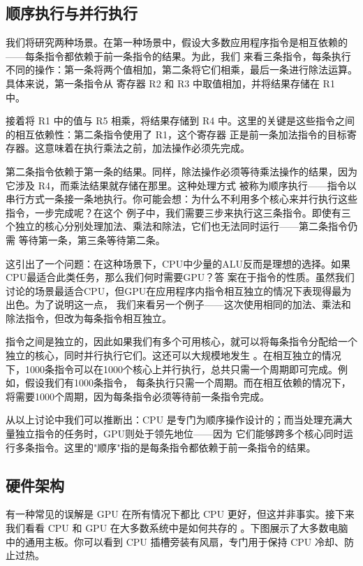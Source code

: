 \subsection{顺序执行与并行执行}

我们将研究两种场景。在第一种场景中，假设大多数应用程序指令是相互依赖的——每条指令都依赖于前一条指令的结果。为此，我们
来看三条指令，每条执行不同的操作：第一条将两个值相加，第二条将它们相乘，最后一条进行除法运算。具体来说，第一条指令从
寄存器 R2 和 R3 中取值相加，并将结果存储在 R1 中。

接着将 R1 中的值与 R5 相乘，将结果存储到 R4 中。这里的关键是这些指令之间的相互依赖性：第二条指令使用了 R1，这个寄存器
正是前一条加法指令的目标寄存器。这意味着在执行乘法之前，加法操作必须先完成。

第二条指令依赖于第一条的结果。同样，除法操作必须等待乘法操作的结果，因为它涉及 R4，而乘法结果就存储在那里。这种处理方式
被称为顺序执行——指令以串行方式一条接一条地执行。你可能会想：为什么不利用多个核心来并行执行这些指令，一步完成呢？在这个
例子中，我们需要三步来执行这三条指令。即使有三个独立的核心分别处理加法、乘法和除法，它们也无法同时运行——第二条指令仍需
等待第一条，第三条等待第二条。

这引出了一个问题：在这种场景下，CPU中少量的ALU反而是理想的选择。如果CPU最适合此类任务，那么我们何时需要GPU？答
案在于指令的性质。虽然我们讨论的场景最适合CPU，但GPU在应用程序内指令相互独立的情况下表现得最为出色。为了说明这一点，
我们来看另一个例子——这次使用相同的加法、乘法和除法指令，但改为每条指令相互独立。

指令之间是独立的，因此如果我们有多个可用核心，就可以将每条指令分配给一个独立的核心，同时并行执行它们。这还可以大规模地发生
。在相互独立的情况下，1000条指令可以在1000个核心上并行执行，总共只需一个周期即可完成。例如，假设我们有1000条指令，
每条执行只需一个周期。而在相互依赖的情况下，将需要1000个周期，因为每条指令必须等待前一条指令完成。

从以上讨论中我们可以推断出：CPU 是专门为顺序操作设计的；而当处理充满大量独立指令的任务时，GPU则处于领先地位——因为
它们能够跨多个核心同时运行多条指令。这里的"顺序"指的是每条指令都依赖于前一条指令的结果。

\subsection{硬件架构}

有一种常见的误解是 GPU 在所有情况下都比 CPU 更好，但这并非事实。接下来我们看看 CPU 和 GPU 在大多数系统中是如何共存的
。下图展示了大多数电脑中的通用主板。你可以看到 CPU 插槽旁装有风扇，专门用于保持 CPU 冷却、防止过热。


